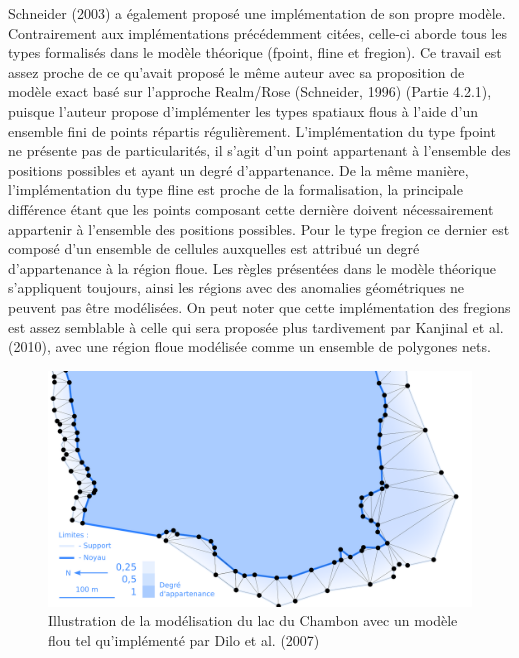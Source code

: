 Schneider (2003) a également proposé une implémentation de son propre
modèle. Contrairement aux implémentations précédemment citées,
celle-ci aborde tous les types formalisés dans le modèle théorique
(fpoint, fline et fregion). Ce travail est assez proche de ce qu’avait
proposé le même auteur avec sa proposition de modèle exact basé sur
l’approche Realm/Rose (Schneider, 1996) (Partie 4.2.1), puisque
l’auteur propose d’implémenter les types spatiaux flous à l’aide d’un
ensemble fini de points répartis régulièrement. L’implémentation du
type fpoint ne présente pas de particularités, il s’agit d’un point
appartenant à l’ensemble des positions possibles et ayant un degré
d’appartenance. De la même manière, l’implémentation du type fline est
proche de la formalisation, la principale différence étant que les
points composant cette dernière doivent nécessairement appartenir à
l’ensemble des positions possibles. Pour le type fregion ce dernier
est composé d’un ensemble de cellules auxquelles est attribué un degré
d’appartenance à la région floue. Les règles présentées dans le modèle
théorique s’appliquent toujours, ainsi les régions avec des anomalies
géométriques ne peuvent pas être modélisées. On peut noter que cette
implémentation des fregions est assez semblable à celle qui sera
proposée plus tardivement par Kanjinal et al. (2010), avec une région
floue modélisée comme un ensemble de polygones nets.

\begin{figure}
  \centering
  \includegraphics{../figures/fig10.png}
  \caption{Illustration de la modélisation du lac du Chambon avec un
    modèle flou tel qu’implémenté par Dilo et al. (2007)}
  \label{fig:champ_dilo}
\end{figure}

